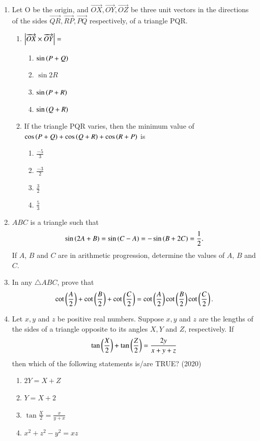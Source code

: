 \begin{enumerate}[label=\thesubsection.\arabic*,ref=\thesubsection.\theenumi]
\begin{multicols}{4}
\end{multicols}
\item
Let O be the origin, and $\overrightarrow{OX},\overrightarrow{OY},\overrightarrow{OZ}$ be three unit vectors in the directions of the sides $\overrightarrow{QR},\overrightarrow{RP},\overrightarrow{PQ}$ respectively, of a triangle PQR.\hfill{}
\begin{enumerate}
	\item $\left\vert\overrightarrow{OX}\times\overrightarrow{OY}\right\vert=$
	\begin{multicols}{4}
\begin{enumerate}
		\item$\sin\left(P+Q\right)$ 
		\item$\sin2R$
		\item$\sin\left(P+R\right)$
		\item$\sin\left(Q+R\right)$
	\end{enumerate}
\end{multicols}
%
	\item If the triangle PQR varies, then the minimum value of $\cos\left(P+Q\right)+\cos\left(Q+R\right)+\cos\left(R+P\right)$ is
	\begin{multicols}{4}
\begin{enumerate}
		\item$\frac{-5}{3}$
		\item$\frac{-3}{2}$
		\item$\frac{3}{2}$
		\item$\frac{5}{3}$
	\end{enumerate}
\end{multicols}
	\end{enumerate}
\item $ABC$ is a triangle such that 
\hfill{}
$$	\sin{\ensuremath{\left(2A+B\right)}}=\sin{\ensuremath{\left(C-A\right)}}=-\sin{\ensuremath{\left(B+2C\right)}}=\frac{1}{2}
.$$
If $A$, $B$ and $C$ are in arithmetic progression, determine the values of $A$, $B$ and $C$.
\item In any $\triangle ABC$, prove that 
\hfill{}
$$
\cot \left(\frac{A}{2}\right)+\cot \left(\frac{B}{2}\right)+\cot \left(\frac{C}{2}\right)=\cot \left(\frac{A}{2}\right)\cot \left(\frac{B}{2}\right)\cot \left(\frac{C}{2}\right).
$$
\item   Let $x, y$ and $z$ be positive real numbers. Suppose $x, y$ and $z$ are the lengths of the sides of a triangle opposite to its angles $X, Y$ and $Z$, respectively. If 
\begin{align}
	\tan\left(\frac{X}{2}\right) + \tan\left(\frac{Z}{2}\right) = \frac{2y}{x + y + z}
\end{align}
    then which of the following statements is/are TRUE?
		\hfill (2020)
	\begin{multicols}{2}
    \begin{enumerate}
        \item  $2Y = X + Z$
        \item  $Y = X + 2$
	\item  $\tan\frac{X}{2} = \frac{x}{y + x}$        
	\item  $x^2 + z^2 - y^2 = xz$
    \end{enumerate}
\end{multicols}
\end{enumerate}
